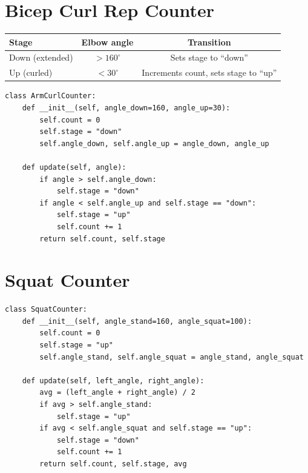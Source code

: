 \documentclass[12pt,a4paper]{article}
\begin{document}
\section{Bicep Curl Rep Counter}

\begin{center}
\begin{tabular}{lcc}
\toprule
\textbf{Stage} & \textbf{Elbow angle} & \textbf{Transition} \\
\midrule
Down (extended) & $> 160^\circ$ & Sets stage to ``down'' \\
Up (curled)     & $< 30^\circ$  & Increments count, sets stage to ``up'' \\
\bottomrule
\end{tabular}
\end{center}

\begin{lstlisting}[caption={Bicep curl counter logic}]
class ArmCurlCounter:
    def __init__(self, angle_down=160, angle_up=30):
        self.count = 0
        self.stage = "down"
        self.angle_down, self.angle_up = angle_down, angle_up

    def update(self, angle):
        if angle > self.angle_down:
            self.stage = "down"
        if angle < self.angle_up and self.stage == "down":
            self.stage = "up"
            self.count += 1
        return self.count, self.stage
\end{lstlisting}

\section{Squat Counter}

\begin{lstlisting}[caption={Squat counter logic}]
class SquatCounter:
    def __init__(self, angle_stand=160, angle_squat=100):
        self.count = 0
        self.stage = "up"
        self.angle_stand, self.angle_squat = angle_stand, angle_squat

    def update(self, left_angle, right_angle):
        avg = (left_angle + right_angle) / 2
        if avg > self.angle_stand:
            self.stage = "up"
        if avg < self.angle_squat and self.stage == "up":
            self.stage = "down"
            self.count += 1
        return self.count, self.stage, avg
\end{lstlisting}
\end{document}
